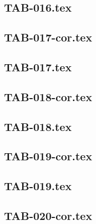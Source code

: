 \renewcommand{\xxexo}{TAB-016.tex} 
\subsection*{\xxexo} 
\graphicspath{{../../exostableaux/equadiffs/\xxexo/}}
 
 
\renewcommand{\xxexo}{TAB-017-cor.tex} 
\subsection*{\xxexo} 
\graphicspath{{../../exostableaux/equadiffs/\xxexo/}}
 
 
\renewcommand{\xxexo}{TAB-017.tex} 
\subsection*{\xxexo} 
\graphicspath{{../../exostableaux/equadiffs/\xxexo/}}
 
 
\renewcommand{\xxexo}{TAB-018-cor.tex} 
\subsection*{\xxexo} 
\graphicspath{{../../exostableaux/equadiffs/\xxexo/}}
 
 
\renewcommand{\xxexo}{TAB-018.tex} 
\subsection*{\xxexo} 
\graphicspath{{../../exostableaux/equadiffs/\xxexo/}}
 
 
\renewcommand{\xxexo}{TAB-019-cor.tex} 
\subsection*{\xxexo} 
\graphicspath{{../../exostableaux/equadiffs/\xxexo/}}
 
 
\renewcommand{\xxexo}{TAB-019.tex} 
\subsection*{\xxexo} 
\graphicspath{{../../exostableaux/equadiffs/\xxexo/}}
 
 
\renewcommand{\xxexo}{TAB-020-cor.tex} 
\subsection*{\xxexo} 
\graphicspath{{../../exostableaux/equadiffs/\xxexo/}}
 
 

